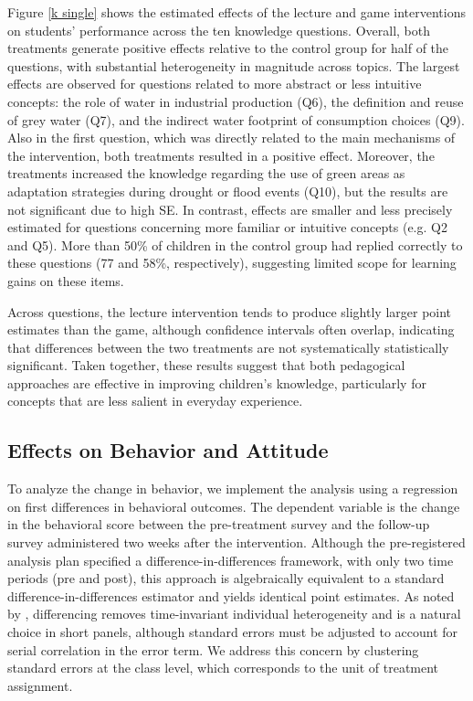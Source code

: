 \documentclass[preprint,12pt]{elsarticle}
\begin{document}
Figure \ref{k single} shows the estimated effects of the lecture and game interventions on students’ performance across the ten knowledge questions. Overall, both treatments generate positive effects relative to the control group for half of the questions, with substantial heterogeneity in magnitude across topics.
The largest effects are observed for questions related to more abstract or less intuitive concepts: the role of water in industrial production (Q6), the definition and reuse of grey water (Q7), and the indirect water footprint of consumption choices (Q9). Also in the first question, which was directly related to the main mechanisms of the intervention, both treatments resulted in a positive effect. Moreover, the treatments increased the knowledge regarding the use of green areas as adaptation strategies during drought or flood events (Q10), but the results are not significant due to high SE. In contrast, effects are smaller and less precisely estimated for questions concerning more familiar or intuitive concepts (e.g. Q2 and Q5). More than 50\% of children in the control group had replied correctly to these questions (77 and 58\%, respectively), suggesting limited scope for learning gains on these items.

Across questions, the lecture intervention tends to produce slightly larger point estimates than the game, although confidence intervals often overlap, indicating that differences between the two treatments are not systematically statistically significant. Taken together, these results suggest that both pedagogical approaches are effective in improving children’s knowledge, particularly for concepts that are less salient in everyday experience.

\subsection{Effects on Behavior and Attitude}
\label{Behavior}

To analyze the change in behavior, we implement the analysis using a regression on first differences in behavioral outcomes. The dependent variable is the change in the behavioral score between the pre-treatment survey and the follow-up survey administered two weeks after the intervention. Although the pre-registered analysis plan specified a difference-in-differences framework, with only two time periods (pre and post), this approach is algebraically equivalent to a standard difference-in-differences estimator and yields identical point estimates. As noted by \cite{angrist2009mostly}, differencing removes time-invariant individual heterogeneity and is a natural choice in short panels, although standard errors must be adjusted to account for serial correlation in the error term. We address this concern by clustering standard errors at the class level, which corresponds to the unit of treatment assignment.
\end{document}
